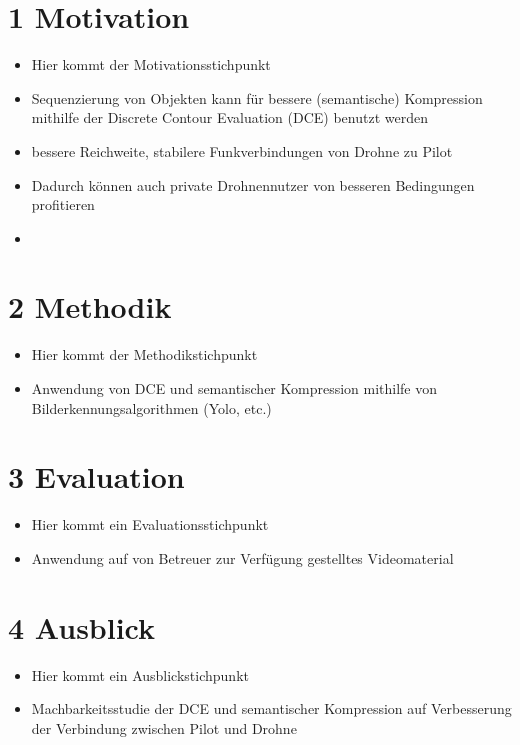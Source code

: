 \documentclass[a4paper,11pt,pdftex]{scrreport}
\begin{document}
\section*{1 Motivation}
\begin{itemize}
    \item Hier kommt der Motivationsstichpunkt
    \item Sequenzierung von Objekten kann für bessere (semantische) Kompression mithilfe der Discrete Contour Evaluation (DCE) benutzt werden
    \item bessere Reichweite, stabilere Funkverbindungen von Drohne zu Pilot
    \item Dadurch können auch private Drohnennutzer von besseren Bedingungen profitieren
    \item 
\end{itemize}


\section*{2 Methodik}
\begin{itemize}
    \item Hier kommt der Methodikstichpunkt
    \item Anwendung von DCE und semantischer Kompression mithilfe von Bilderkennungsalgorithmen (Yolo, etc.)
    

\end{itemize}



\section*{3 Evaluation}
\begin{itemize}
    \item Hier kommt ein Evaluationsstichpunkt
    \item Anwendung auf von Betreuer zur Verfügung gestelltes Videomaterial
\end{itemize}


\section*{4 Ausblick}
\begin{itemize}
    \item Hier kommt ein Ausblickstichpunkt
    \item Machbarkeitsstudie der DCE und semantischer Kompression auf Verbesserung der Verbindung zwischen Pilot und Drohne
\end{itemize}

\appendix

 


\setcounter{page}{1}
\end{document}
